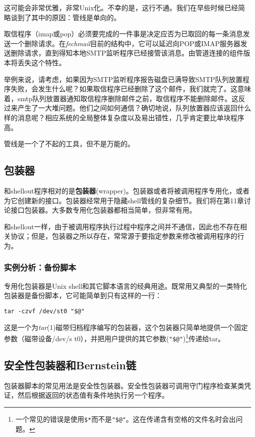 \documentclass[12pt,oneside]{book}
\begin{document}
\begin{common-format}
这可能会非常优雅，非常Unix化。不幸的是，这行不通。我们在早些时候已经简略谈到了其中的原因：管线是单向的。

取信程序（imap或pop）必须要完成的一件事是决定应否为已取回的每一条消息发送一个删除请求。在\textit{fechmail}目前的结构中，它可以延迟向POP或IMAP服务器发送删除请求，直到得知本地SMTP监听程序已经接管该消息。由管道连接的组件版本将丢失这个特性。

举例来说，请考虑，如果因为SMTP监听程序报告磁盘已满导致SMTP队列放置程序失败，会发生什么呢？如果取信程序已经删除了这个邮件，我们就完了。这意味着，smtp队列放置器通知取信程序删除邮件之前，取信程序不能删除邮件。这反过来产生了一大堆问题。他们之间如何通信？确切地说，队列放置器应该返回什么样的消息呢？相应系统的全局整体复杂度以及易出错性，几乎肯定要比单块程序高。

管线是一个了不起的工具，但不是万能的。


\subsection{包装器}
和shellout程序相对的是\textbf{包装器}(wrapper)。包装器或者将被调用程序专用化，或者为它创建新的接口。包装器经常用于隐藏shell管线的复杂细节。我们将在第11章讨论接口包装器。大多数专用化包装器都相当简单，但非常有用。

和shellout一样，由于被调用程序执行过程中程序之间并不通信，因此也不存在相关协议；但是，包装器之所以存在，常常源于要指定参数来修改被调用程序的行为。


\subsubsection{实例分析：备份脚本}
专用化包装器是Unix shell和其它脚本语言的经典用途。既常用又典型的一类特化包装器是备份脚本，它可能简单到只有这样的一行：
\begin{Verbatim}
tar -czvf /dev/st0 "$@"
\end{Verbatim}

这是一个为\textit{tar}(1)磁带归档程序编写的包装器，这个包装器只简单地提供一个固定参数（磁带设备/dev/s t0），并把用户提供的其它参数(\verb+"$@"+)\footnote{一个常见的错误是使用\verb+$*+而不是\verb+"$@"+。这在传递含有空格的文件名时会出问题。}传递给tar。


\subsection{安全性包装器和Bernstein链}
包装器脚本的常见用法是安全性包装器。安全性包装器可调用守门程序检查某类凭证，然后根据返回的状态值有条件地执行另一个程序。


\end{common-format}
\end{document}
